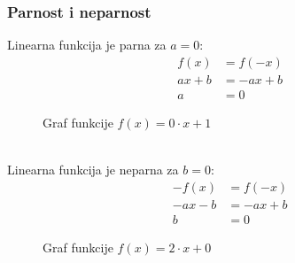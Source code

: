 \subsubsection{Parnost i neparnost \lin}
    Linearna funkcija je parna za \(a = 0\):
    \begin{equation*}
        \begin{split}
            f(x) & = f(-x) \\
            ax + b & = -ax + b \\
            a & = 0
        \end{split}
    \end{equation*}
    \begin{figure}[ht]
        \centering
        \caption{Graf funkcije \(f(x) = 0 \cdot x + 1\)} 
        \label{fig:template}
    \end{figure}
    \\
    Linearna funkcija je neparna za \(b = 0\):
    \begin{equation*}
        \begin{split}
            -f(x) & = f(-x) \\
            -ax - b & = -ax + b \\
            b & = 0
        \end{split}
    \end{equation*}
    \begin{figure}[ht]
        \centering
        \caption{Graf funkcije \(f(x) = 2 \cdot x + 0\)} 
        \label{fig:template}
    \end{figure}
    \\

